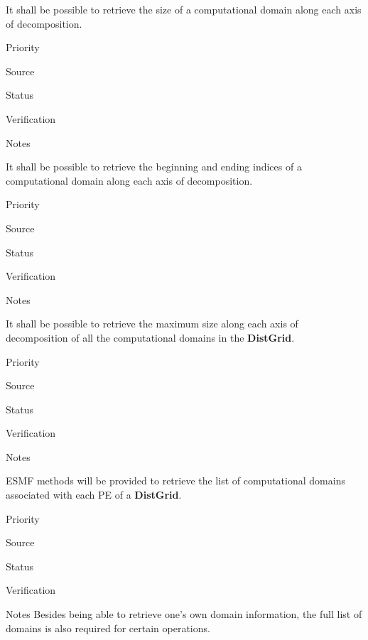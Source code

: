 


It shall be possible to retrieve the size of a computational domain
along each axis of decomposition.

\begin{reqlist}
\item[Priority]
\item[Source]
\item[Status]
\item[Verification]
\item[Notes]
\end{reqlist}


It shall be possible to retrieve the beginning and ending indices of a
computational domain along each axis of decomposition.

\begin{reqlist}
\item[Priority]
\item[Source]
\item[Status]
\item[Verification]
\item[Notes]
\end{reqlist}


It shall be possible to retrieve the maximum size along each axis of
decomposition of all the computational domains in the \textbf{DistGrid}. 

\begin{reqlist}
\item[Priority]
\item[Source]
\item[Status]
\item[Verification]
\item[Notes]
\end{reqlist}


ESMF methods will be provided to retrieve the list of computational
domains associated with each PE of a  \textbf{DistGrid}.

\begin{reqlist}
\item[Priority]
\item[Source]
\item[Status]
\item[Verification]
\item[Notes] Besides being able to retrieve one's own domain
  information, the full list of domains is also required for certain
  operations.
\end{reqlist}

